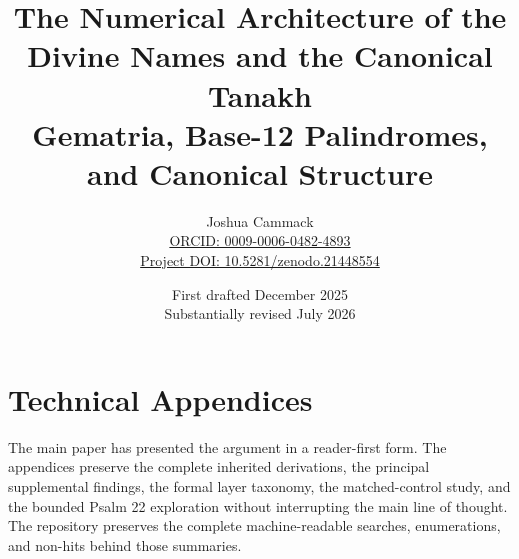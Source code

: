 \documentclass[11pt,letterpaper]{article}
\title{The Numerical Architecture of the Divine Names and the Canonical Tanakh\\
\large Gematria, Base-12 Palindromes, and Canonical Structure}
\author{Joshua Cammack\\
\small\href{https://orcid.org/0009-0006-0482-4893}{ORCID: 0009-0006-0482-4893}\\
\small\href{https://doi.org/10.5281/zenodo.21448554}{Project DOI: 10.5281/zenodo.21448554}}
\date{First drafted December 2025\\
Substantially revised July 2026}
\begin{document}
\maketitle
\setcounter{tocdepth}{1}
\tableofcontents
\newpage













\clearpage
\appendix
\section*{Technical Appendices}

The main paper has presented the argument in a reader-first form. The appendices preserve the complete inherited derivations, the principal supplemental findings, the formal layer taxonomy, the matched-control study, and the bounded Psalm 22 exploration without interrupting the main line of thought. The repository preserves the complete machine-readable searches, enumerations, and non-hits behind those summaries.






\end{document}
